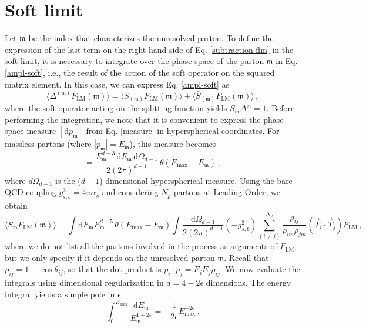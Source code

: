 \documentclass[a4paper, 12pt]{book}
\newcommand{\um}{\mathfrak{m}}
\begin{document}
\section{Soft limit}
Let $\um$ be the index that characterizes the unresolved parton. To define the expression of the last term on the right-hand side of Eq. \ref{subtraction-flm} in the soft limit, it is necessary to integrate over the phase space of the parton $\um$ in Eq. \ref{ampl-soft}, i.e., the result of the action of the soft operator on the squared matrix element. In this case, we can express Eq. \ref{ampl-soft} as
\begin{equation}
  \langle \Delta^{(\um)}F_{\mathrm{LM}}(\um) \rangle = \langle S_{(\um)}F_{\mathrm{LM}}(\um) \rangle + \langle \bar{S}_{(\um)}F_{\mathrm{LM}}(\um) \rangle \, ,
\end{equation}
where the soft operator acting on the splitting function yields  $S_\um \Delta^{\um} = 1$. Before performing the integration, we note that it is convenient to express the phase-space measure $[\mathrm{d}p_\um]$ from Eq. \ref{measure} in hyperspherical coordinates. For massless partons (where $|p_\um|=E_\um$), this measure becomes
\begin{equation}
  [\mathrm{d}p_\um] = \frac{E_\um^{d-3} \,\mathrm{d}E_\um  \, \mathrm{d}\Omega_{d-1}}{2 (2 \pi)^{d-1}} \, \theta(E_{\mathrm{max}}-E_\um) \, ,
  \label{measure-ps}
\end{equation}
where ${d}\Omega_{d-1}$ is the ($d-1$)-dimensional hyperspherical measure. Using the bare QCD coupling $g_{s,b}^2 = 4\pi\alpha_s$ and considering $N_p$ partons at Leading Order, we obtain
\begin{equation}
  \langle S_\um F_{\mathrm{LM}} (\um) \rangle = \int \mathrm{d}E_\um E_\um^{d-5} \, \theta(E_{\mathrm{max}}-E_\um)  \int \frac{\mathrm{d}\Omega_{d-1}}{2 (2 \pi)^{d-1}} (-g_{s,b}^2) \sum_{(i \neq j)}^{N_p} \frac{\rho_{ij}}{\rho_{im}\rho_{jm}} (\vec{T}_i \cdot \vec{T}_j) F_{\mathrm{LM}} \, ,
\end{equation}
where we do not list all the partons involved in the process as arguments of $F_{\mathrm{LM}}$, but we only 
specify if it depends on the unresolved parton $\um$. Recall that $\rho_{ij} = 1 - \cos\theta_{ij}$, so that the dot product is $p_i \cdot p_j = E_i E_j \rho_{ij}$. We now evaluate the integrals using dimensional regularization in $d=4-2\epsilon$ dimensions. The energy integral yields a simple pole in $\epsilon$
\begin{equation}
  \int_0^{E_{\mathrm{max}}} \frac{\mathrm{d}E_\um}{ E_\um^{1+2\epsilon}} = - \frac{1}{2 \epsilon} E_{\mathrm{max}}^{-2 \epsilon} \, .
\end{equation}
\end{document}
